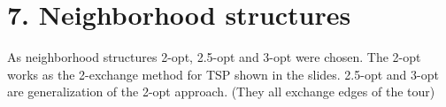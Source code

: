 \section*{7. Neighborhood structures}
As neighborhood structures 2-opt, 2.5-opt and 3-opt were chosen. The 2-opt works as the 2-exchange method for TSP shown in the slides. 2.5-opt and 3-opt are generalization of the 2-opt approach. (They all exchange edges of the tour)